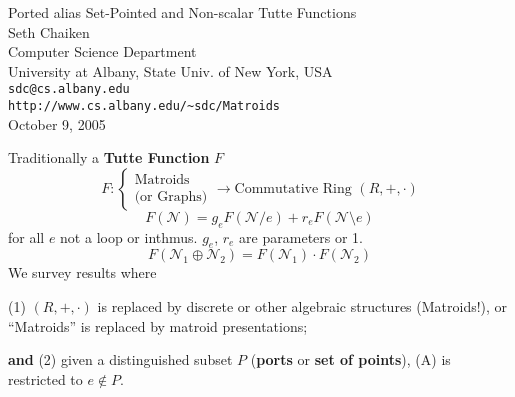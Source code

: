 \documentclass[%
  slidesonly,%
  semlayer,%
  amsmath
  ]{seminar}                                  %
\title{}
\author{}
\date{\today}
\begin{document}


\begin{slide}
\begin{center}
Ported alias Set-Pointed and Non-scalar Tutte Functions \\

Seth Chaiken\\
Computer Science Department\\[-0.8ex]
University at Albany, State Univ. of New York, USA\\[-0.8ex]
\texttt{sdc@cs.albany.edu}\\
\verb|http://www.cs.albany.edu/~sdc/Matroids|\\

October 9, 2005

\end{center}
\end{slide}

\begin{slide}
Traditionally a \textbf{Tutte Function} $F$
\[
F:\left\{\begin{array}{l} \mbox{Matroids } \\ \mbox{(or Graphs)} \end{array}\right.
\rightarrow \mbox{Commutative Ring\ \ } (R,+,\cdot)
\]
\begin{equation}
F(\mathcal{N}) = g_eF(\mathcal{N}/e) + r_eF(\mathcal{N}\setminus e)
\tag{A}
\end{equation}
for all $e$ not a loop or inthmus.  $g_e$, $r_e$ are parameters or 1.
\begin{equation}
F(\mathcal{N}_1\oplus\mathcal{N}_2)
=F(\mathcal{N}_1)\cdot F(\mathcal{N}_2)
\tag{M}
\end{equation}
We survey results where

\noindent (1) $(R,+,\cdot)$ is replaced by discrete or
other algebraic structures (Matroids!), or ``Matroids'' is replaced by 
matroid presentations;

\noindent \textbf{and} (2) given a distinguished subset $P$ (\textbf{ports} or
\textbf{set of points}), (A) is restricted to $e\not\in P$.
\end{slide}
\end{document}
